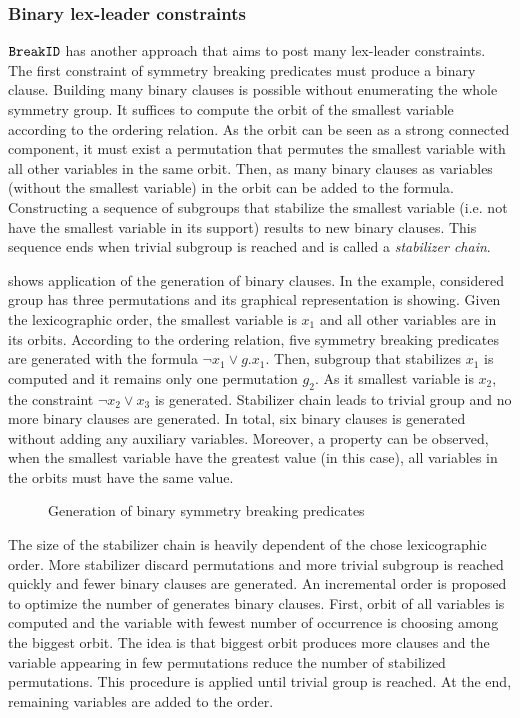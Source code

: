\subsubsection{Binary lex-leader constraints}
$\texttt{BreakID}$ has another approach that aims to post many lex-leader constraints.
The first constraint of symmetry breaking predicates must produce a binary clause.
Building many binary clauses is possible without enumerating the whole symmetry group. 
It suffices to compute the orbit of the smallest variable according to the ordering relation. As the orbit can be seen as a strong connected component, it must exist a permutation that permutes the smallest variable with all other variables in the same orbit.
Then, as many binary clauses as variables (without the smallest variable) in the orbit can be added to the formula. Constructing a sequence of subgroups that stabilize the smallest variable (i.e. not have the smallest variable in its support) results to new binary clauses.
This sequence ends when trivial subgroup is reached and is called a  \emph{stabilizer chain}.

 shows application of the generation of binary clauses.
In the example, considered group has three permutations and its graphical representation
is showing. Given the lexicographic order, the smallest variable is $x_1$ and 
all other variables are in its orbits. According to the ordering relation, five 
symmetry breaking predicates are generated with the formula $\neg x_1 \lor g.x_1$.
Then, subgroup that stabilizes $x_1$ is computed and it remains only one permutation $g_2$.
As it smallest variable is $x_2$, the constraint $\neg x_2 \lor x_3$ is generated.
Stabilizer chain leads to trivial group and no more binary clauses are generated.
In total, six binary clauses is generated without adding any auxiliary variables.
Moreover, a property can be observed, when the smallest variable have the greatest value 
(\true in this case), all variables in the orbits must have the same value.
 \begin{figure}[!htbp]
 
 \caption{Generation of binary symmetry breaking predicates}
 \label{fig:binary_sbp}
\end{figure}

The size of the stabilizer chain is heavily dependent of the chose lexicographic order.
More stabilizer discard permutations and more trivial subgroup is reached quickly and fewer 
binary clauses are generated. An incremental order is proposed to optimize the number of generates binary clauses. First, orbit of all variables is computed and the variable with fewest number of occurrence is choosing among the biggest orbit. The idea is that biggest orbit produces more
clauses and the variable appearing in few permutations reduce the number of stabilized permutations. This procedure is applied until trivial group is reached. At the end, remaining variables are added to the order.


